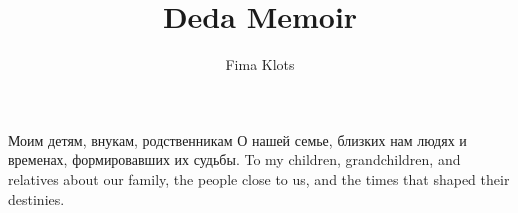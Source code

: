 \documentclass[11pt,a4paper,oneside]{book}
\begin{document}
\title{Deda Memoir}
\author{Fima Klots}
\date{}

\begin{titlepage}
  \vspace*{\fill}
  \begin{center}
      \translate
        {Моим детям, внукам, родственникам О нашей семье, близких нам людях и временах, формировавших их судьбы.}
        {To my children, grandchildren, and relatives about our family, the people close to us, and the times that shaped their destinies.}
  \end{center}
  \vspace*{\fill}
\end{titlepage}

\begin{paracol}{2}

\end{paracol}

\begin{paracol}{2}

\end{paracol}
\end{document}

